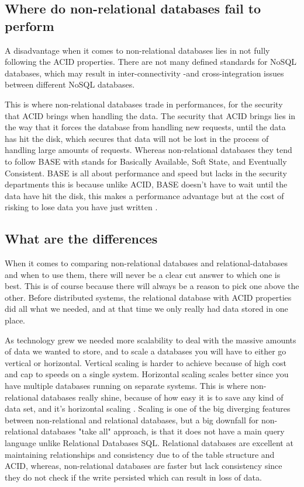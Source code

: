 \subsection{Where do non-relational databases fail to perform}
A disadvantage when it comes to non-relational databases lies in not fully following the ACID properties. There are not many defined standards for NoSQL databases, which may result in inter-connectivity -and cross-integration issues between different NoSQL databases. \parencite{loginradius-rdbms-vs-nosql}

This is where non-relational databases trade in performances, for the security that ACID brings when handling the data. The security that ACID brings lies in the way that it forces the database from handling new requests, until the data has hit the disk, which secures that data will not be lost in the process of handling large amounts of requests.
Whereas non-relational databases they tend to follow BASE with stands for Basically Available, Soft State, and Eventually Consistent. 
BASE is all about performance and speed but lacks in the security departments this is because unlike ACID, BASE doesn't have to wait until the data have hit the disk, this makes a performance advantage but at the cost of risking to lose data you have just written  \parencite{neo4j-acid-vs-base} \parencite{dataversity-acid-vs-base}.

\subsection{What are the differences}
When it comes to comparing non-relational databases and relational-databases and when to use them, there will never be a clear cut answer to which one is best. This is of course because there will always be a reason to pick one above the other.
Before distributed systems, the relational database with ACID properties did all what we needed, and at that time we only really had data stored in one place.

As technology grew we needed more scalability to deal with the massive amounts of data we wanted to store, and to scale a databases you will have to either go vertical or horizontal.
Vertical scaling is harder to achieve because of high cost and cap to speeds on a single system. Horizontal scaling scales better since you have multiple databases running on separate systems. This is where non-relational databases really shine, because of how easy it is to save any kind of data set, and it’s horizontal scaling \parencite{investopedia-horizontal-vs-vertical-scaling}.
Scaling is one of the big diverging features between non-relational and relational databases, but a big downfall for non-relational databases "take all" approach, is that it does not have a main query language unlike Relational Databases SQL. 
Relational databases are excellent at maintaining relationships and consistency due to of the table structure and ACID, whereas, non-relational databases are faster but lack consistency since they do not check if the write persisted which can result in loss of data.
